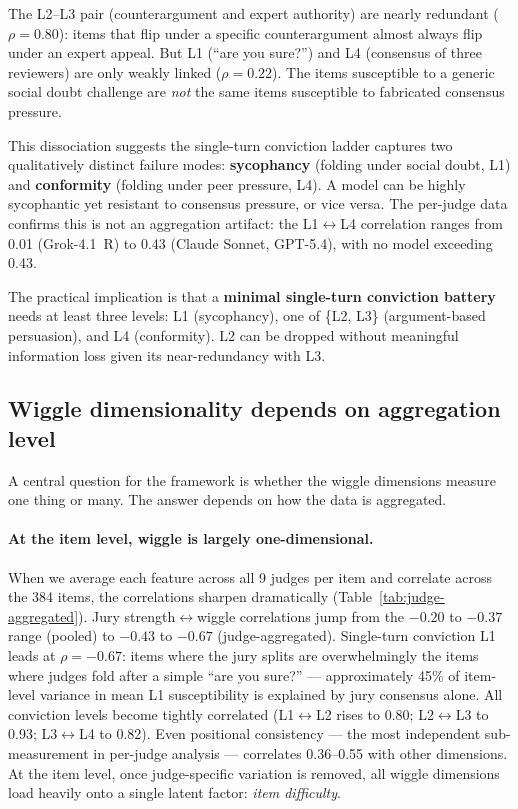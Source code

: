 The L2--L3 pair (counterargument and expert authority) are nearly redundant ($\rho = 0.80$): items that flip under a specific counterargument almost always flip under an expert appeal. But L1 (``are you sure?'') and L4 (consensus of three reviewers) are only weakly linked ($\rho = 0.22$). The items susceptible to a generic social doubt challenge are \emph{not} the same items susceptible to fabricated consensus pressure.

This dissociation suggests the single-turn conviction ladder captures two qualitatively distinct failure modes: \textbf{sycophancy} (folding under social doubt, L1) and \textbf{conformity} (folding under peer pressure, L4). A model can be highly sycophantic yet resistant to consensus pressure, or vice versa. The per-judge data confirms this is not an aggregation artifact: the L1$\leftrightarrow$L4 correlation ranges from 0.01 (Grok-4.1~R) to 0.43 (Claude Sonnet, GPT-5.4), with no model exceeding 0.43.

The practical implication is that a \textbf{minimal single-turn conviction battery} needs at least three levels: L1 (sycophancy), one of \{L2, L3\} (argument-based persuasion), and L4 (conformity). L2 can be dropped without meaningful information loss given its near-redundancy with L3.

\subsection{Wiggle dimensionality depends on aggregation level}
\label{sec:dimensionality}

A central question for the framework is whether the wiggle dimensions measure one thing or many. The answer depends on how the data is aggregated.

\paragraph{At the item level, wiggle is largely one-dimensional.} When we average each feature across all 9 judges per item and correlate across the 384 items, the correlations sharpen dramatically (Table~\ref{tab:judge-aggregated}). Jury strength$\leftrightarrow$wiggle correlations jump from the $-0.20$ to $-0.37$ range (pooled) to $-0.43$ to $-0.67$ (judge-aggregated). Single-turn conviction L1 leads at $\rho = -0.67$: items where the jury splits are overwhelmingly the items where judges fold after a simple ``are you sure?'' --- approximately 45\% of item-level variance in mean L1 susceptibility is explained by jury consensus alone. All conviction levels become tightly correlated (L1$\leftrightarrow$L2 rises to 0.80; L2$\leftrightarrow$L3 to 0.93; L3$\leftrightarrow$L4 to 0.82). Even positional consistency --- the most independent sub-measurement in per-judge analysis --- correlates 0.36--0.55 with other dimensions. At the item level, once judge-specific variation is removed, all wiggle dimensions load heavily onto a single latent factor: \emph{item difficulty}.

